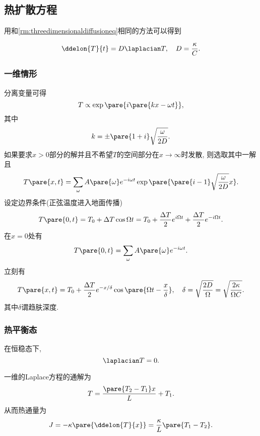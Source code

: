 \documentclass[../Thermal.tex]{subfiles}
\begin{document}
\subsection{热扩散方程}
用和\cref{rm:threedimensionaldiffusioneq}相同的方法可以得到
\begin{finale}
\[ \ddelon{T}{t} = D\laplacian T, \quad D = \frac{\kappa}{C}. \]
\end{finale}
\subsubsection{一维情形}
分离变量可得
\[ T \propto \exp\pare{i\pare{kx-\omega t}}, \]
其中
\[ k = \pm\pare{1+i}\sqrt{\frac{\omega}{2D}}. \]
如果要求$x>0$部分的解并且不希望$T$的空间部分在$x\rightarrow\infty$时发散, 则选取其中一解且
\[ T\pare{x,t} = \sum_\omega A\pare{\omega} e^{-i\omega t}\exp\pare{\pare{i-1}\sqrt{\frac{\omega}{2D}}x}. \]
设定边界条件(正弦温度进入地面传播)
\[ T\pare{0,t} = T_0 + \Delta T \cos \Omega t = T_0 + \frac{\Delta T}{2} e^{i\Omega t} + \frac{\Delta T}{2} e^{-i \Omega t}. \]
在$x=0$处有
\[ T\pare{0,t} = \sum_\omega A\pare{\omega} e^{-i\omega t}. \]
立刻有
\begin{equation}
\label{eq:skindelta}
T\pare{x,t} = T_0 + \frac{\Delta T}{2}e^{-x/\delta}\cos\pare{\Omega t - \frac{x}{\delta}}, \quad \delta = \sqrt{\frac{2D}{\Omega}} = \sqrt{\frac{2\kappa}{\Omega C}}.
\end{equation}
其中$\delta$谓趋肤深度.
\subsubsection{热平衡态}
在恒稳态下,
\[ \laplacian T = 0. \]
\begin{ex}
一维的Laplace方程的通解为
\[ T = \frac{\pare{T_2 - T_1}x}{L} + T_1. \]
从而热通量为
\[ J = -\kappa\pare{\ddelon{T}{x}} = \frac{\kappa}{L}\pare{T_1 - T_2}. \]
\end{ex}
\end{document}
